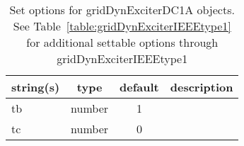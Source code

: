 \begin{table}[ht]
\centering
\begin{tabular}{p{5cm} c c p{7cm}}
\hline
string(s) & type & default & description \\
\hline
tb & number & 1 & \\
tc & number & 0 & \\
\hline
\end{tabular}
\caption{Set options for gridDynExciterDC1A objects. See Table~\ref{table:gridDynExciterIEEEtype1} for additional settable options through gridDynExciterIEEEtype1}
\label{table:gridDynExciterDC1A}
\end{table}

